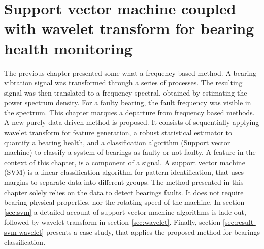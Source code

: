 \documentclass[../Main/thesis.tex]{subfiles}
\begin{document}
\chapter[Support vector machine coupled with wavelet transform for bearing health monitoring]{Support vector machine coupled with wavelet transform for bearing health monitoring}
\label{sec:waveletandsvm}
The previous chapter presented some what a frequency based method. A bearing vibration signal was transformed through a series of  processes. The resulting signal was then translated to a frequency spectral, obtained by estimating the power spectrum density. For a faulty bearing, the fault frequency was visible in the spectrum.
\justify
This chapter marques a departure from frequency based methods. A new purely data driven method is proposed. It consists of sequentially applying wavelet transform for feature generation, a robust statistical estimator to quantify a bearing health, and a classification algorithm (Support vector machine) to classify a system of bearings as faulty or not faulty. A feature in the context of this chapter, is a component of a signal. A support vector machine (SVM) is a linear classification algorithm for pattern identification, that uses margins to separate data into different groups.
\justify
The method presented in this chapter solely relies on the data to detect bearings faults. It does not require bearing physical properties, nor the rotating speed of the machine. 
In section \ref{sec:svm} a detailed account of support vector machine algorithms is lade out, followed by wavelet transform in section \ref{sec:wavelet}. Finally, section \ref{sec:result-svm-wavelet} presents a case study, that applies the proposed method for bearings classification.





\end{document}
